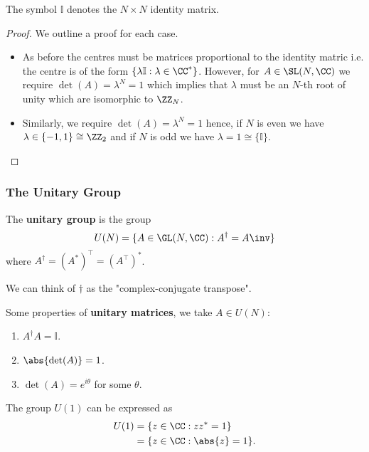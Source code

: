 \documentclass[12pt, a4paper]{article}
\begin{document}
\begin{mdremark}
    The symbol \(\mathbb{I}\) denotes the \(N \times N\) identity matrix.
\end{mdremark}

\begin{proof}
    We outline a proof for each case.
    \begin{itemize}
        \item As before the centres must be matrices proportional to the identity matric i.e. the centre is of the form \(\{\lambda \mathbb{I} : \lambda \in \CC^*\}\). However, for \(A \in \SL(N,\CC)\) we require \(\det(A) = \lambda^N =1\) which implies that \(\lambda\) must be an \(N\)-th root of unity which are isomorphic to \(\ZZ_N\). 
        \item Similarly, we require \(\det(A) = \lambda^N =1\) hence, if \(N\) is even we have \(\lambda \in \{-1,1\} \cong \ZZ_2\) and if \(N\) is odd we have \(\lambda = 1 \cong \{\mathbb{I}\}\).
    \end{itemize}
\end{proof}

\subsubsection{The Unitary Group}

\begin{definition}
    The \textbf{unitary group} is the group
    \[U(N) = \{A \in \GL(N,\CC) : A^{\dagger}=A\inv\}\]
    where \(A^{\dagger} = (A^*)^\top=(A^\top)^*\).
\end{definition}

\begin{mdnote}
    We can think of \(\dagger\) as the "complex-conjugate transpose".
\end{mdnote}

\begin{mdprop}
    Some properties of \textbf{unitary matrices}, we take \(A \in U(N)\):
    \begin{enumerate}
        \item \(A^{\dagger}A = \mathbb{I}\).
        \item \(\abs{\det(A)}=1\).
        \item \(\det(A) = e^{i\theta}\) for some \(\theta\).
    \end{enumerate}
\end{mdprop}

\begin{corollary}
    The group \(U(1)\) can be expressed as
    \[\begin{aligned}
        U(1) &= \{z\in \CC : zz^*=1\} \\
            &= \{z \in \CC : \abs{z}=1\}.
    \end{aligned}\]
\end{corollary}
\end{document}
